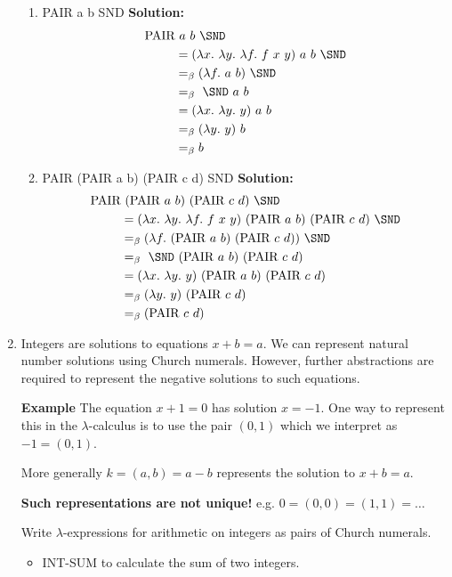 \documentclass[11pt]{report}
\begin{document}
\begin{enumerate}
\begin{enumerate}
			\item PAIR a b SND 
			{\bf Solution:}
			\begin{align*}
				\PAIR &\ a \ b \ \SND \\
				&= (\lambda x. \ \lambda y. \ \lambda f. \ f \ x \ y) \ a \ b \ \SND \\
				&\beq (\lambda f. \ a \ b) \ \SND \\
				&\beq \ \SND \ a \ b \\
				&= (\lambda x. \ \lambda y. \ y) \ a \ b \\
				&\beq (\lambda y. \ y) \ b \\
				&\beq b
			\end{align*}

			\item PAIR (PAIR a b) (PAIR c d) SND
			{\bf Solution:}
			\begin{align*}
				\PAIR &\ (\PAIR \ a \ b) \ (\PAIR \ c \ d) \ \SND \\
				&= (\lambda x. \ \lambda y. \ \lambda f. \ f \ x \ y) \ (\PAIR \ a \ b) \ (\PAIR \ c \ d) \ \SND \\
				&\beq (\lambda f. \ (\PAIR \ a \ b) \ (\PAIR \ c \ d)) \ \SND \\
				&\beq \ \SND \ (\PAIR \ a \ b) \ (\PAIR \ c \ d) \\
				&= (\lambda x. \ \lambda y. \ y) \ (\PAIR \ a \ b) \ (\PAIR \ c \ d) \\
				&\beq (\lambda y. \ y) \ (\PAIR \ c \ d) \\
				&\beq (\PAIR \ c \ d)
			\end{align*}

		\end{enumerate}

	\newpage
	\item Integers are solutions to equations $x + b = a$. We can represent natural number solutions using Church numerals. However, further abstractions are required to represent the negative solutions to such equations. 

	{\bf Example} The equation $x + 1 = 0$ has solution $x = -1$. One way to represent this in the $\lambda$-calculus is to use the pair $(0,1)$ which we interpret as $-1 = (0,1)$. 
	
	More generally $k = (a,b) = a - b$ represents the solution to $x + b = a$.

	\hspace{0.5cm} {\bf Such representations are not unique!} e.g. $0 = (0,0) = (1,1) = \dots$

	Write $\lambda$-expressions for arithmetic on integers as pairs of Church numerals.
		\begin{itemize}
			\item[] INT-SUM to calculate the sum of two integers.
				

\end{itemize}
\end{enumerate}
\end{document}
